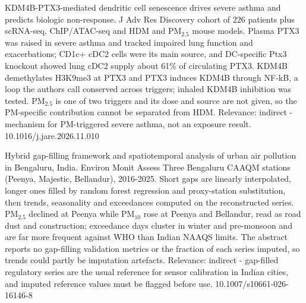 \documentclass[10pt]{article}
\begin{document}
\par{}\baselineskip{}\baselineskip
{}

{KDM4B-PTX3-mediated dendritic cell senescence drives severe asthma and predicts biologic non-response.}
{J Adv Res}
{Discovery cohort of 226 patients plus scRNA-seq, ChIP/ATAC-seq and HDM and PM$_{2.5}$ mouse models. Plasma PTX3 was raised in severe asthma and tracked impaired lung function and exacerbations; CD1c+ cDC2 cells were its main source, and DC-specific Ptx3 knockout showed lung cDC2 supply about 61\% of circulating PTX3. KDM4B demethylates H3K9me3 at PTX3 and PTX3 induces KDM4B through NF-kB, a loop the authors call conserved across triggers; inhaled KDM4B inhibition was tested. PM$_{2.5}$ is one of two triggers and its dose and source are not given, so the PM-specific contribution cannot be separated from HDM. Relevance: indirect - mechanism for PM-triggered severe asthma, not an exposure result.}
{10.1016/j.jare.2026.11.010}

\par{}\baselineskip{}\baselineskip
{}

{Hybrid gap-filling framework and spatiotemporal analysis of urban air pollution in Bengaluru, India.}
{Environ Monit Assess}
{Three Bengaluru CAAQM stations (Peenya, Majestic, Bellandur), 2016-2025. Short gaps are linearly interpolated, longer ones filled by random forest regression and proxy-station substitution, then trends, seasonality and exceedances computed on the reconstructed series. PM$_{2.5}$ declined at Peenya while PM$_{10}$ rose at Peenya and Bellandur, read as road dust and construction; exceedance days cluster in winter and pre-monsoon and are far more frequent against WHO than Indian NAAQS limits. The abstract reports no gap-filling validation metrics or the fraction of each series imputed, so trends could partly be imputation artefacts. Relevance: indirect - gap-filled regulatory series are the usual reference for sensor calibration in Indian cities, and imputed reference values must be flagged before use.}
{10.1007/s10661-026-16146-8}
\end{document}
